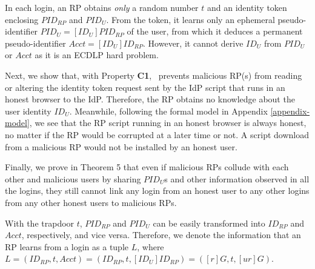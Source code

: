 In each login, an RP obtains \emph{only} a random number $t$ and an identity token enclosing $PID_{RP}$ and $PID_U$. From the token, it learns only an ephemeral pseudo-identifier $PID_{U} = [{ID_U}]{PID_{RP}}$ of the user, from which it deduces a permanent pseudo-identifier $Acct = [ID_U]ID_{RP}$. However, it cannot derive $ID_U$ from $PID_{U}$ or $Acct$ as it is an ECDLP hard problem.

Next, we show that, with Property {\bf C1}, \usso\ prevents malicious RP(s) from reading or altering the identity token request sent by the IdP script that runs in an honest browser to the IdP. Therefore, the RP obtains no knowledge about the user identity $ID_U$. Meanwhile, following the formal model in Appendix \ref{appendix-model}, we see that the RP script running in an honest browser is always honest, no matter if the RP would be corrupted at a later time or not. A script download from a malicious RP would not be installed by an honest user. 

Finally, we prove in Theorem 5 that even if malicious RPs collude with each other and malicious users by sharing $PID_U$s and other information observed in all the logins, they still cannot link any login from an honest user to any other logins from any other honest users to malicious RPs.




With the trapdoor $t$, $PID_{RP}$ and $PID_U$ can be easily transformed into $ID_{RP}$ and $Acct$, respectively, and vice versa. Therefore, we denote the information that an RP learns from a login as a tuple $L$, where $L =(ID_{RP}, t, Acct)=(ID_{RP}, t, [ID_{U}]ID_{RP})=([r]G, t, [ur]G)$.



